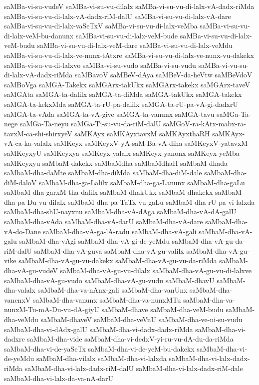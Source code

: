 {saMBa-vi-su-vudeV
saMBa-vi-su-vu-dilalx
saMBa-vi-su-vu-di-lalx-vA-dadx-riMda
saMBa-vi-su-vu-di-lalx-vA-dadx-riM-dalU
saMBa-vi-su-vu-di-lalx-vA-dare
saMBa-vi-su-vu-di-lalx-vaSeTxV
saMBa-vi-su-vu-di-lalx-veMba
saMBa-vi-su-vu-di-lalx-veM-bu-danunx
saMBa-vi-su-vu-di-lalx-veM-bude
saMBa-vi-su-vu-di-lalx-veM-budu
saMBa-vi-su-vu-di-lalx-veM-dare
saMBa-vi-su-vu-di-lalx-veMdu
saMBa-vi-su-vu-di-lalx-ve-nunx-tAtxre
saMBa-vi-su-vu-di-lalx-ve-nunx-vu-dakekx
saMBa-vi-su-vu-di-lalxvo
saMBa-vi-su-vudo
saMBa-vi-su-vudu
saMBa-vi-vu-su-di-lalx-vA-dadx-riMda
saMBavoV
saMBeV-dAya
saMBeV-da-heVtw
saMBeVdoV
saMBoVga
saMGA-Takekx
saMGArx-takUkx
saMGArx-takekx
saMGArx-taveV
saMGAta
saMGA-ta-dalilx
saMGA-ta-diMda
saMGA-takUkx
saMGA-takekx
saMGA-ta-kekxMda
saMGA-ta-rU-pa-dalilx
saMGA-ta-rU-pa-vA-gi-dadxrU
saMGA-ta-vAda
saMGA-ta-vA-give
saMGA-ta-vanunx
saMGA-tavu
saMGa-Ta-nege
saMGa-Ta-neyu
saMGa-Ti-su-vu-da-riM-dalU
saMGoV-ra-kAtx-mabx-ra-tavxM-ca-shi-shirxyeV
saMKAyx
saMKAyxtavxM
saMKAyxthaRH
saMKAyx-vA-ca-ka-valalx
saMKeyx
saMKeyxV-yA-saM-Ba-vA-diha
saMKeyxV-yatavxM
saMKeyxyU
saMKeyxya
saMKeyx-yalalx
saMKeyx-yanonx
saMKeyx-yeMba
saMKeyxyu
saMbaM-dakekx
saMbaMdha
saMbaMdhaH
saMbaM-dhada
saMbaM-dha-daMte
saMbaM-dha-diMda
saMbaM-dha-diM-dale
saMbaM-dha-diM-daloV
saMbaM-dha-ga-Lalilx
saMbaM-dha-ga-Lanunx
saMbaM-dha-gaLu
saMbaM-dha-garxM-tha-dalilx
saMbaM-dhakUkx
saMbaM-dhakekx
saMbaM-dha-pa-Du-vu-dilalx
saMbaM-dha-pa-TaTx-vu-gaLu
saMbaM-dha-rU-pa-vi-lalxda
saMbaM-dha-shU-nayxnu
saMbaM-dha-vA-dAga
saMbaM-dha-vA-dA-galU
saMbaM-dha-vAda
saMbaM-dha-vA-darU
saMbaM-dha-vA-dare
saMbaM-dha-vA-do-Dane
saMbaM-dha-vA-ga-lA-radu
saMbaM-dha-vA-gali
saMbaM-dha-vA-galu
saMbaM-dha-vAgi
saMbaM-dha-vA-gi-de-yeMdu
saMbaM-dha-vA-gu-da-riM-dalU
saMbaM-dha-vA-guva
saMbaM-dha-vA-gu-valilx
saMbaM-dha-vA-gu-vike
saMbaM-dha-vA-gu-vu-dakekx
saMbaM-dha-vA-gu-vu-da-riMda
saMbaM-dha-vA-gu-vudeV
saMbaM-dha-vA-gu-vu-dilalx
saMbaM-dha-vA-gu-vu-di-lalxve
saMbaM-dha-vA-gu-vudo
saMbaM-dha-vA-gu-vudu
saMbaM-dhavU
saMbaM-dha-valalx
saMbaM-dha-va-nAnx-gali
saMbaM-dha-vanUnx
saMbaM-dha-vanenxV
saMbaM-dha-vanunx
saMbaM-dha-va-nunxMTu
saMbaM-dha-va-nunxM-Tu-mA-Du-vu-dA-giyU
saMbaM-dhave
saMbaM-dha-veM-budu
saMbaM-dha-veMdu
saMbaM-dhaveV
saMbaM-dha-veVnU
saMbaM-dha-ve-ni-su-vudu
saMbaM-dha-vi-dAdx-galU
saMbaM-dha-vi-dadx-dadx-riMda
saMbaM-dha-vi-dadxre
saMbaM-dha-vide
saMbaM-dha-vi-dedxV-yi-ru-vu-dA-du-da-riMda
saMbaM-dha-vi-de-yaSeTx
saMbaM-dha-vi-de-yeM-bu-dakekx
saMbaM-dha-vi-de-yeMdu
saMbaM-dha-vilalx
saMbaM-dha-vi-lalxda
saMbaM-dha-vi-lalx-dadx-riMda
saMbaM-dha-vi-lalx-dadx-riM-dalU
saMbaM-dha-vi-lalx-dadx-riM-dale
saMbaM-dha-vi-lalx-da-va-nA-darU
}
